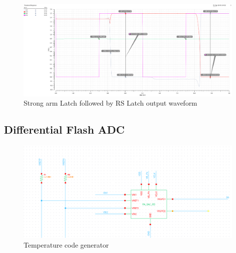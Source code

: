 \documentclass[a4paper,12pt]{article}
\begin{document}
\begin{itemize}
\begin{figure}[H]
    \centering
    \includegraphics[max width = \textwidth]{Flash_ADC_images/RS_latch_out.png}
    \caption{Strong arm Latch followed by RS Latch output waveform}
    \label{fig:enter-label}
\end{figure}
\end{itemize}

\subsection{Differential Flash ADC}
\begin{figure}[H]
    \centering
    \includegraphics[max width = \textwidth]{Flash_ADC_images/temp_codegen.png}
    \caption{Temperature code generator}
    \label{fig:enter-label}
\end{figure}
\end{document}
